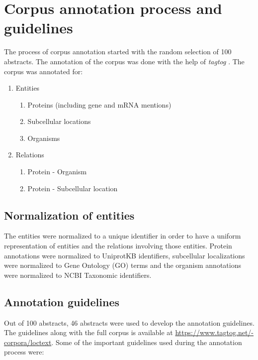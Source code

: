 \section{Corpus annotation process and guidelines}

The process of corpus annotation started with the random selection of 100 abstracts. The annotation of the corpus was done with the help of \textit{tagtog} \cite{cejuela2014tagtog}. The corpus was annotated for:

\begin{enumerate}
\item Entities
\begin{enumerate}
\item Proteins (including gene and mRNA mentions)
\item Subcellular locations
\item Organisms
\end{enumerate}
\item Relations
\begin{enumerate}
\item Protein - Organism
\item Protein - Subcellular location
\end{enumerate}
\end{enumerate}

\subsection*{Normalization of entities}

The entities were normalized to a unique identifier in order to have a uniform representation of entities and the relations involving those entities. Protein annotations were normalized to UniprotKB \cite{magrane2011uniprot} identifiers, subcellular localizations were normalized to Gene Ontology (GO) \cite{ashburner2000gene} terms and the organism annotations were normalized to NCBI Taxonomic \cite{ncbiTaxonomy} identifiers.

\subsection*{Annotation guidelines}
Out of 100 abstracts, 46 abstracts were used to develop the annotation guidelines. The guidelines along with the full corpus is available at \url{https://www.tagtog.net/-corpora/loctext}. Some of the important guidelines used during the annotation process were:


